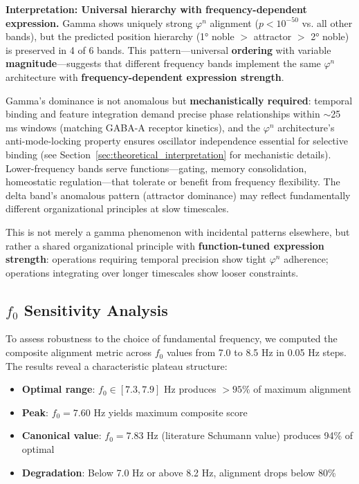 \documentclass[11pt,a4paper]{article}
\newcommand{\phisym}{\varphi}
\newcommand{\fzero}{f_0}
\begin{document}
\begin{criticalpoint}
\textbf{Interpretation: Universal hierarchy with frequency-dependent expression.} Gamma shows uniquely strong $\phisym^n$ alignment ($p < 10^{-50}$ vs. all other bands), but the predicted position hierarchy (1° noble $>$ attractor $>$ 2° noble) is preserved in 4 of 6 bands. This pattern---universal \textbf{ordering} with variable \textbf{magnitude}---suggests that different frequency bands implement the same $\phisym^n$ architecture with \textbf{frequency-dependent expression strength}.

Gamma's dominance is not anomalous but \textbf{mechanistically required}: temporal binding and feature integration demand precise phase relationships within $\sim$25 ms windows (matching GABA-A receptor kinetics), and the $\phisym^n$ architecture's anti-mode-locking property ensures oscillator independence essential for selective binding (see Section~\ref{sec:theoretical_interpretation} for mechanistic details). Lower-frequency bands serve functions---gating, memory consolidation, homeostatic regulation---that tolerate or benefit from frequency flexibility. The delta band's anomalous pattern (attractor dominance) may reflect fundamentally different organizational principles at slow timescales.

This is not merely a gamma phenomenon with incidental patterns elsewhere, but rather a shared organizational principle with \textbf{function-tuned expression strength}: operations requiring temporal precision show tight $\phisym^n$ adherence; operations integrating over longer timescales show looser constraints.
\end{criticalpoint}

\subsection{$\fzero$ Sensitivity Analysis}
\label{sec:f0_sensitivity}

To assess robustness to the choice of fundamental frequency, we computed the composite alignment metric across $\fzero$ values from 7.0 to 8.5 Hz in 0.05 Hz steps. The results reveal a characteristic plateau structure:

\begin{itemize}
    \item \textbf{Optimal range}: $\fzero \in [7.3, 7.9]$ Hz produces $>95\%$ of maximum alignment
    \item \textbf{Peak}: $\fzero = 7.60$ Hz yields maximum composite score
    \item \textbf{Canonical value}: $\fzero = 7.83$ Hz (literature Schumann value) produces 94\% of optimal
    \item \textbf{Degradation}: Below 7.0 Hz or above 8.2 Hz, alignment drops below 80\%
\end{itemize}
\end{document}
